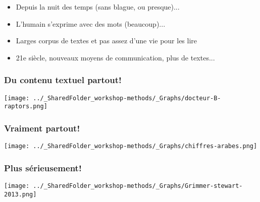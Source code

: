 \documentclass{beamer}
\begin{document}
     

 \begin{frame}
      
      \begin{itemize}
       
         \frametitle{Une analyse quantitative des textes? Bro, on est en sciences sociales...} \vspace{1cm}
       
            \item<2-> Depuis la nuit des temps (sans blague, ou presque)...
            \item<3-> L'humain s'exprime avec des mots (beaucoup)...
            \item<4-> Larges corpus de textes et pas assez d'une vie pour les lire
            \item<5-> 21e siècle, nouveaux moyens de communication, plus de textes...
       
      \end{itemize}
       
  \end{frame}
     
          
\begin{frame}
      
   \frametitle{Du contenu textuel partout!} \vspace{1cm}
        \begin{center}
        \texttt{[image: ../\_SharedFolder\_workshop-methods/\_Graphs/docteur-B-raptors.png]} 
    \end{center}
      
 \end{frame}
     
          
 \begin{frame}
      
    \frametitle{Vraiment partout!} \vspace{1cm}
      
        \begin{center}
         \texttt{[image: ../\_SharedFolder\_workshop-methods/\_Graphs/chiffres-arabes.png]}
      \end{center}
      
  \end{frame}
     
     
          
          
 \begin{frame}
      
       \frametitle{Plus sérieusement!} \vspace{1cm}
      
            \begin{center}
            \texttt{[image: ../\_SharedFolder\_workshop-methods/\_Graphs/Grimmer-stewart-2013.png]}
       \end{center}
     
\end{frame}
     
\end{document}
